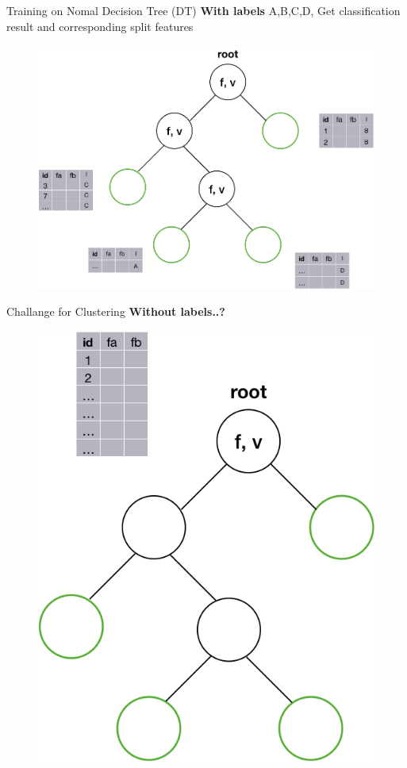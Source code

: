 \documentclass[shortpres]{beamer}
\begin{document}
\begin{frame}{Training on Nomal Decision Tree (DT)}	
  \textbf{With labels} A,B,C,D,  Get classification result and corresponding split features
  \begin{figure}
    \includegraphics[height=0.6\textheight]{fig/dt3.png} 
  \end{figure}
  \end{frame}
\begin{frame}{Challange for Clustering}	
\textbf{Without labels..?} 

  \begin{figure}
    \includegraphics[height=0.6\textheight]{fig/dtwithout1.png} 
  \end{figure}
  \end{frame}
\end{document}

